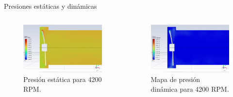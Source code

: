 \begin{frame}{Presiones estáticas y dinámicas}
    \begin{columns}
        \begin{block}{}
        \begin{figure}[ht!]
            \centering
            \includegraphics[width=\linewidth]{dump/sta3.png}
            \caption{Presión estática para 4200 RPM.}
        \end{figure}
    \end{block}
    \begin{block}{}
        \begin{figure}[ht!]
            \centering
            \includegraphics[width=\linewidth]{dump/dyn3.png}
            \caption{Mapa de presión dinámica para 4200 RPM.}
        \end{figure}
    \end{block}
    \end{columns}
\end{frame}

